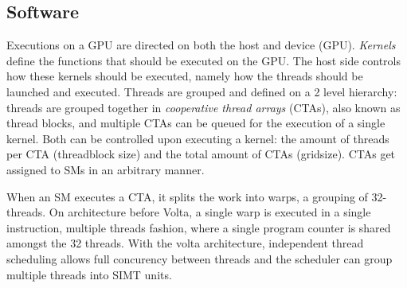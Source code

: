 \subsection{Software}
Executions on a GPU are directed on both the host and device (GPU).
\textit{Kernels} define the functions that should be executed on the GPU.
The host side controls how these kernels should be executed, namely how the threads should be launched and executed.
Threads are grouped and defined on a 2 level hierarchy: threads are grouped together in \textit{cooperative thread arrays} (CTAs), also known as thread blocks, and multiple CTAs can be queued for the execution of a single kernel.
Both can be controlled upon executing a kernel: the amount of threads per CTA (threadblock size) and the total amount of CTAs (gridsize).
CTAs get assigned to SMs in an arbitrary manner.

When an SM executes a CTA, it splits the work into warps, a grouping of 32-threads.
On architecture before Volta, a single warp is executed in a single instruction, multiple threads fashion, where a single program counter is shared amongst the 32 threads.
With the volta architecture, independent thread scheduling allows full concurency between threads and the scheduler can group multiple threads into SIMT units.



\begin{figure}[!hb]
    \centering
    \caption{
    }
\end{figure}


\begin{figure}[!hb]
    \centering
    \caption{
    }
\end{figure}


